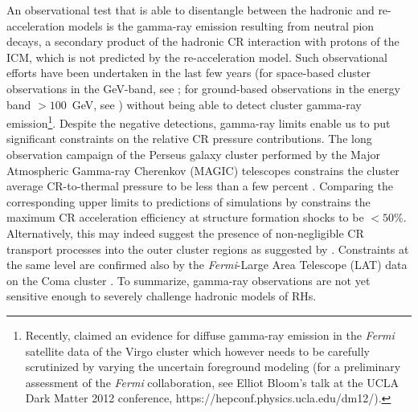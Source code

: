 \documentclass[traditabstract]{aa}
\begin{document}
An observational test that is able to disentangle between the hadronic and
re-acceleration models is the gamma-ray emission resulting from neutral pion
decays, a secondary product of the hadronic CR interaction with protons of the
ICM, which is not predicted by the re-acceleration model. Such observational
efforts have been undertaken in the last few years (for space-based cluster
observations in the GeV-band, see \citealt{2003ApJ...588..155R,
  2010ApJ...717L..71A, 2010JCAP...05..025A, 2012AAS...21920701Z,
  2012arXiv1201.1003H}; for ground-based observations in the energy band
$>100$~GeV, see \citealt{2006ApJ...644..148P, 2008AIPC.1085..569P,
  2009A&A...495...27A, 2009arXiv0907.0727T, 2009arXiv0907.3001D,
  2009arXiv0907.5000G, cangaroo_clusters, 2009ApJ...706L.275A,
  2010ApJ...710..634A, 2011arXiv1111.5544M}) without being able to detect
cluster gamma-ray emission\footnote[1]{Recently, \cite{2012arXiv1201.1003H}
  claimed an evidence for diffuse gamma-ray emission in the \emph{Fermi}
  satellite data of the Virgo cluster which however needs to be carefully
  scrutinized by varying the uncertain foreground modeling (for a preliminary
  assessment of the \emph{Fermi} collaboration, see Elliot Bloom's talk at the
  UCLA Dark Matter 2012 conference, https://hepconf.physics.ucla.edu/dm12/).}.
Despite the negative detections, gamma-ray limits enable us to put significant
constraints on the relative CR pressure contributions. The long observation
campaign of the Perseus galaxy cluster performed by the Major Atmospheric
Gamma-ray Cherenkov (MAGIC) telescopes constrains the cluster average
CR-to-thermal pressure to be less than a few percent
\citep{2010ApJ...710..634A,2011arXiv1111.5544M}. Comparing the corresponding
upper limits to predictions of simulations by \cite{2010MNRAS.409..449P}
constrains the maximum CR acceleration efficiency at structure formation shocks
to be $<50\%$.  Alternatively, this may indeed suggest the presence of
non-negligible CR transport processes into the outer cluster regions as
suggested by \cite{2011A&A...527A..99E}.  Constraints at the same level are
confirmed also by the \emph{Fermi}-Large Area Telescope (LAT) data on the Coma
cluster \citep{2011PhRvD..84l3509P, 2012AAS...21920701Z,
  2012arXiv1201.1003H}. To summarize, gamma-ray observations are not yet
sensitive enough to severely challenge hadronic models of RHs.
\end{document}
